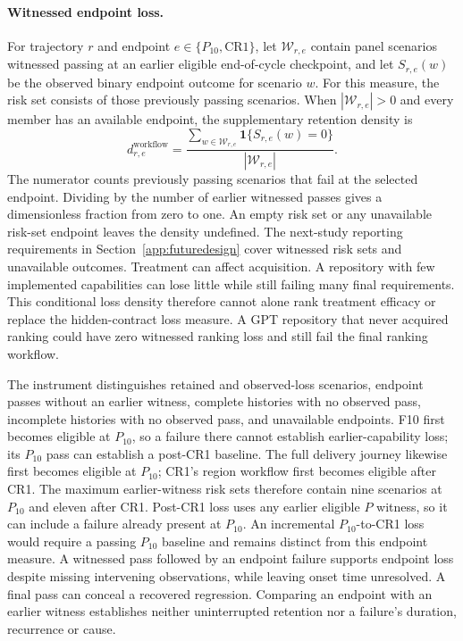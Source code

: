\paragraph{Witnessed endpoint loss.}
For trajectory $r$ and endpoint $e\in\{P_{10},\mathrm{CR1}\}$, let
$\mathcal{W}_{r,e}$ contain panel scenarios witnessed passing at an
earlier eligible end-of-cycle checkpoint, and let $S_{r,e}(w)$ be the
observed binary endpoint outcome for scenario $w$. For this measure, the risk set consists of those previously passing
scenarios. When $|\mathcal{W}_{r,e}|>0$ and every member has an available
endpoint, the supplementary retention density is
\begin{equation}
d^{\mathrm{workflow}}_{r,e}=
\frac{\sum_{w\in\mathcal{W}_{r,e}}\mathbf{1}\{S_{r,e}(w)=0\}}
{|\mathcal{W}_{r,e}|}.
\label{eq:workflowloss}
\end{equation}
The numerator counts previously passing scenarios that fail at the
selected endpoint. Dividing by the number of earlier witnessed passes
gives a dimensionless fraction from zero to one. An empty risk set
or any unavailable risk-set endpoint leaves the density undefined.
The next-study reporting requirements in Section~\ref{app:futuredesign}
cover witnessed risk sets and unavailable outcomes.
Treatment can affect acquisition. A repository with few implemented
capabilities can lose little while still failing many final requirements.
This conditional loss density therefore cannot alone rank treatment efficacy
or replace the hidden-contract loss measure. A GPT repository that never
acquired ranking could have zero witnessed ranking loss and still fail
the final ranking workflow.

The instrument distinguishes retained and observed-loss scenarios,
endpoint passes without an earlier witness, complete histories with no
observed pass, incomplete histories with no observed pass, and unavailable
endpoints. F10 first becomes eligible at $P_{10}$, so a failure there
cannot establish earlier-capability loss; its $P_{10}$ pass can establish
a post-CR1 baseline. The full delivery journey likewise first becomes
eligible at $P_{10}$; CR1's region workflow first becomes eligible after
CR1. The maximum earlier-witness risk sets therefore contain nine scenarios
at $P_{10}$ and eleven after CR1. Post-CR1 loss uses any earlier eligible
$P$ witness, so it can include a failure already present at $P_{10}$.
An incremental $P_{10}$-to-CR1 loss would require a passing $P_{10}$
baseline and remains distinct from this endpoint measure.
A witnessed pass followed by an endpoint failure
supports endpoint loss despite missing intervening observations, while
leaving onset time unresolved. A final pass can conceal a recovered
regression. Comparing an endpoint with an earlier witness establishes neither
uninterrupted retention nor a failure's duration, recurrence or cause.

